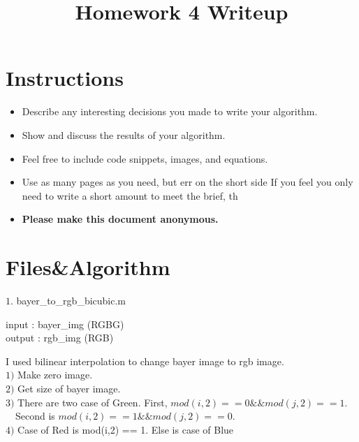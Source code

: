 \date{}

\title{\vspace{-1cm}Homework 4 Writeup}



\maketitle
\vspace{-3cm}
\thispagestyle{fancy}

\section*{Instructions}
\begin{itemize}
  \item Describe any interesting decisions you made to write your algorithm.
  \item Show and discuss the results of your algorithm.
  \item Feel free to include code snippets, images, and equations.
  \item Use as many pages as you need, but err on the short side If you feel you only need to write a short amount to meet the brief, th
  
  \item \textbf{Please make this document anonymous.}
\end{itemize}

\newcommand\tab[1][1cm]{\hspace*{#1}}
\section*{Files\&Algorithm}  

{\large $1.$ bayer\_to\_rgb\_bicubic.m \par}
\tab input : bayer\_img (RGBG) \\
\tab output : rgb\_img (RGB)

\tab I used bilinear interpolation to change bayer image to rgb image. \\
\tab $1)$ Make zero image. \\
\tab $2)$ Get size of bayer image. \\
\tab $3)$ There are two case of Green. First, $mod(i,2) == 0 \&\& mod(j,2)== 1.$ \\ \tab \ \ Second is  $mod(i,2) == 1 \&\& mod(j,2) == 0.$\\
\tab $4)$ Case of Red is mod(i,2) == 1. Else is case of Blue \\

